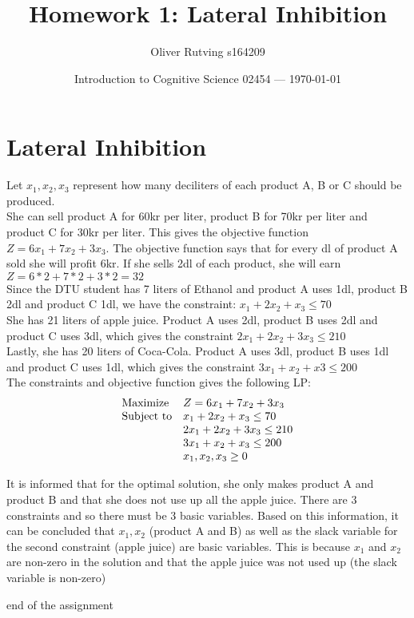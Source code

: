 \documentclass{article}
\title{Homework 1: Lateral Inhibition} %
\author{Oliver Rutving s164209} %
\date{Introduction to Cognitive Science 02454 --- \today} %
\begin{document}
\maketitle %


\section{Lateral Inhibition} %
Let $x_1, x_2, x_3$ represent how many deciliters of each product A, B or C should be produced. 
\\
She can sell product A for 60kr per liter, product B for 70kr per liter and product C for 30kr per liter. This gives the objective function $Z=6x_1+7x_2+3x_3$. 
The objective function says that for every dl of product A sold she will profit 6kr. If she sells 2dl of each product, she will earn $Z=6*2+7*2+3*2=32$
\\
Since the DTU student has 7 liters of Ethanol and product A uses 1dl, product B 2dl and product C 1dl, we have the constraint: $x_1+2x_2+x_3\leq 70$
\\
She has 21 liters of apple juice. Product A uses 2dl, product B uses 2dl and product C uses 3dl, which gives the constraint $2x_1+2x_2+3x_3\leq 210$
\\
Lastly, she has 20 liters of Coca-Cola. Product A uses 3dl, product B uses 1dl and product C uses 1dl, which gives the constraint $3x_1+x_2+x3\leq 200$
\\
The constraints and objective function gives the following LP:
\\
\begin{equation*}
    \begin{array}{ll@{}ll}
    \text{Maximize}  & Z=6x_1+7x_2+3x_3 &\\
    \text{Subject to}& x_1+2x_2+x_3\leq 70\\
                     & 2x_1+2x_2+3x_3\leq 210\\
                     & 3x_1+x_2+x_3\leq 200\\
                     & x_1, x_2, x_3 \geq 0
\end{array}
\end{equation*}

It is informed that for the optimal solution, she only makes product A and product B and that she does not use up all the apple juice.
There are 3 constraints and so there must be 3 basic variables.
Based on this information, it can be concluded that $x_1, x_2$ (product A and B) as well as the slack variable for the second constraint (apple juice) are basic variables. 
This is because $x_1$ and $x_2$ are non-zero in the solution and that the apple juice was not used up (the slack variable is non-zero)





\hrulefill 
end of the assignment
\end{document}
